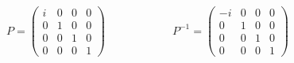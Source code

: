\begin{equation}
    P=\begin{pmatrix}
        i & 0 & 0 & 0\\
        0 & 1 & 0 & 0\\
        0 & 0 & 1 & 0\\
        0 & 0 & 0 & 1
        \end{pmatrix}
        \qquad \qquad \qquad
        P^{-1}=\begin{pmatrix}
            -i & 0 & 0 & 0\\
            0 & 1 & 0 & 0\\
            0 & 0 & 1 & 0\\
            0 & 0 & 0 & 1
            \end{pmatrix}
    \label{PiP}
\end{equation}\\

